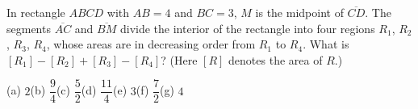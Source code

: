 In rectangle $ABCD$ with $AB=4$ and $BC=3$, $M$ is the midpoint of $\overline{CD}$. The segments $\overline{AC}$ and $\overline{BM}$ divide the interior of the rectangle into four regions $R_1$, $R_2$, $R_3$, $R_4$, whose areas are in decreasing order from $R_1$ to $R_4$. What is $[R_1]-[R_2]+[R_3]-[R_4]$? (Here $[R]$ denotes the area of $R$.)

(a) $2$\quad (b) $\dfrac{9}{4}$\quad (c) $\dfrac{5}{2}$\quad (d) $\dfrac{11}{4}$\quad (e) $3$\quad (f) $\dfrac{7}{2}$\quad (g) $4$
